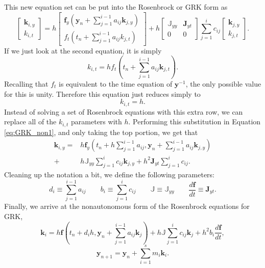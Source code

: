 \documentclass{ansconf}
\numberwithin{equation}{section}
\begin{document}
This new equation set can be put into the Rosenbrock or GRK form as
  \begin{equation}\label{eq:GRK_non1}
    \left[ \begin{array}{c}
    \mathbf{k}_{i,y} \\
    k_{i,t}
    \end{array} \right ] = h\left[ \begin{array}{c}
    \mathbf{f}_y\left(\mathbf{y}_n + \sum_{j=1}^{i-1}a_{ij}\mathbf{k}_{j,y}\right) \\
    f_t\left(t_n + \sum_{j=1}^{i-1}a_{ij}k_{j,t}\right) 
    \end{array} \right] +  h\left[ \begin{array}{cc}
        \mathbb{J}_{yy} & \mathbf{J}_{yt} \\
    0 & 0
    \end{array} \right]\sum_{j=1}^i c_{ij}\left[ \begin{array}{c}
    \mathbf{k}_{j,y} \\
    k_{j,t}
    \end{array} \right].
  \end{equation}
If we just look at the second equation, it is simply
  \begin{equation}
     k_{i,t} = h f_t\left(t_n + \sum_{j=1}^{i-1}a_{ij}\mathbf{k}_{j,t}\right).
  \end{equation}
Recalling that $f_t$ is equivalent to the time equation of $\mathbf{y}^{-1}$, the only possible value for this is unity. Therefore this equation just reduces simply to 
\begin{equation}
    k_{i,t} = h.
\end{equation}
Instead of solving a set of Rosenbrock equations with this extra row, we can replace all of the $k_{i,t}$ parameters with $h$. Performing this substitution in Equation \ref{eq:GRK_non1}, and only taking the top portion, we get that
  \begin{align}
    \mathbf{k}_{i,y} = &  h\mathbf{f}_y \left(t_n + h\sum_{j=1}^{i-1}a_{ij},\mathbf{y}_n + \sum_{j=1}^{i-1}a_{ij}\mathbf{k}_{j,y}\right) \\
                                + & h\mathbb{J}_{yy}\sum_{j=1}^i c_{ij}\mathbf{k}_{j,y}  + h^2\mathbf{J}_{yt}\sum_{j=1}^i c_{ij}\nonumber.
  \end{align}
Cleaning up the notation a bit, we define the following parameters:
\begin{equation}
    d_i \equiv \sum_{j=1}^{i-1} a_{ij} \qquad  b_i \equiv \sum_{j=1}^i c_{ij} \qquad \mathbb{J} \equiv \mathbb{J}_{yy} \qquad \frac{d\mathbf{f}}{dt} \equiv \mathbf{J}_{yt}.
\end{equation}
Finally, we arrive at the nonautonomous form of the Rosenbrock equations for GRK,
  \begin{equation}
     \mathbf{k}_{i} = h\mathbf{f} \left(t_n + d_ih,\mathbf{y}_n + \sum_{j=1}^{i-1}a_{ij}\mathbf{k}_{j}\right) 
                                + h\mathbb{J}\sum_{j=1}^i c_{ij}\mathbf{k}_{j}  + h^2b_i\frac{d\mathbf{f}}{dt},
  \end{equation}
  \begin{equation}
     \mathbf{y}_{n+1} = \mathbf{y}_{n} + \sum_{i=1}^s m_i\mathbf{k}_i.
  \end{equation}
\end{document}
